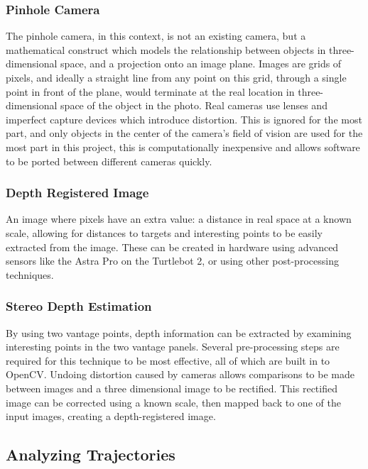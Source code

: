 \documentclass{article}[12]
\begin{document}
		\subsubsection{Pinhole Camera}
		
		The pinhole camera, in this context, is not an existing camera, but a mathematical construct which models the relationship between objects in three-dimensional space, and a projection onto an image plane. Images are grids of pixels, and ideally a straight line from any point on this grid, through a single point in front of the plane, would terminate at the real location in three-dimensional space of the object in the photo. Real cameras use lenses and imperfect capture devices which introduce distortion. This is ignored for the most part, and only objects in the center of the camera's field of vision are used for the most part in this project, this is computationally inexpensive and allows software to be ported between different cameras quickly. 
		
		\subsubsection{Depth Registered Image}
		
		An image where pixels have an extra value: a distance in real space at a known scale, allowing for distances to targets and interesting points to be easily extracted from the image. These can be created in hardware using advanced sensors like the Astra Pro on the Turtlebot 2, or using other post-processing techniques.
		
		\subsubsection{Stereo Depth Estimation}
		
		By using two vantage points, depth information can be extracted by examining interesting points in the two vantage panels. Several pre-processing steps are required for this technique to be most effective, all of which are built in to OpenCV. Undoing distortion caused by cameras allows comparisons to be made between images and a three dimensional image to be rectified. This rectified image can be corrected using a known scale, then mapped back to one of the input images, creating a depth-registered image.
		
	
	\subsection{Analyzing Trajectories}
	
\end{document}
